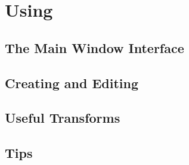 \chapter{Using \dtypkgu{}}
\label{chap:using_epspline}

	\section{The Main Window Interface}%
	\label{sec:window_interface}
	

	\section{Creating and Editing}%
	\label{sec:creat_editing}
	

	\section{Useful Transforms}%
	\label{sec:useful_transforms}
	

	\section{Tips}%
	\label{sec:tips_tricks}


